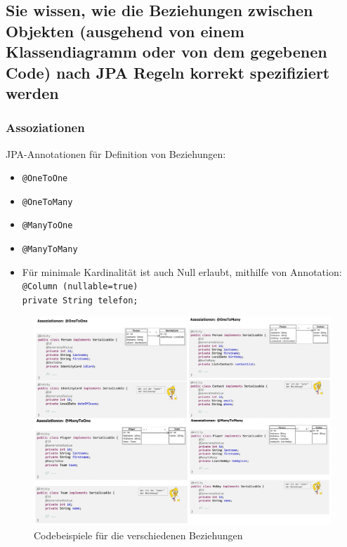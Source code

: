 \documentclass[a4paper]{article}
\begin{document}
		\subsection{Sie wissen, wie die Beziehungen zwischen Objekten (ausgehend von einem Klassendiagramm oder von dem gegebenen Code) nach JPA Regeln korrekt spezifiziert werden}
		
			\subsubsection{Assoziationen}
			
			JPA-Annotationen für Definition von Beziehungen:
			\begin{itemize}
				\item \texttt{@OneToOne} \qquad\quad[ 1 : 1 ]
				\item \texttt{@OneToMany} \qquad [ 1 : m ]
				\item \texttt{@ManyToOne} \qquad [ m : 1 ]
				\item \texttt{@ManyToMany} \qquad[ m : m ]
				\item Für minimale Kardinalität ist auch Null erlaubt, mithilfe von Annotation:\\
				\texttt{@Column (nullable=true)}\\
				\texttt{private String telefon;}
			\end{itemize}
		
			\begin{figure}[!htb]
				\centering
				\includegraphics[keepaspectratio, width=.9\textwidth]{img/persistence/associations.png}
				\caption{Codebeispiele für die verschiedenen Beziehungen}
				\label{fig:associations}
			\end{figure}
			
\end{document}
